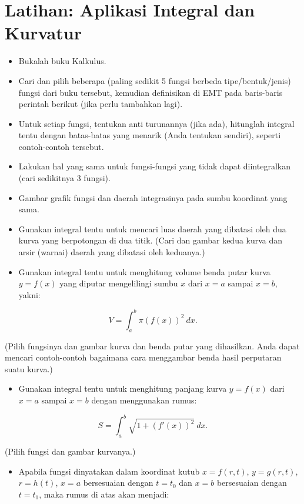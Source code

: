 \documentclass[a4paper,11pt,oneside,enabledeprecatedfontcommands]{scrbook}
\newenvironment{eulernotebook}{}{}
\newcommand{\eulersubheading}[1]{\section{#1}}
\newenvironment{eulercomment}{\par\medskip\noindent}{\par\medskip}
\newenvironment{eulerformula}{}{}
\begin{document}
\begin{eulernotebook}
\eulersubheading{Latihan: Aplikasi Integral dan Kurvatur}
\begin{eulercomment}
\begin{itemize}
    \item Bukalah buku Kalkulus.
    \item Cari dan pilih beberapa (paling sedikit 5 fungsi berbeda tipe/bentuk/jenis) fungsi dari buku tersebut, kemudian definisikan di EMT pada baris-baris perintah berikut (jika perlu tambahkan lagi).
    \item Untuk setiap fungsi, tentukan anti turunannya (jika ada), hitunglah integral tentu dengan batas-batas yang menarik (Anda tentukan sendiri), seperti contoh-contoh tersebut.
    \item Lakukan hal yang sama untuk fungsi-fungsi yang tidak dapat diintegralkan (cari sedikitnya 3 fungsi).
    \item Gambar grafik fungsi dan daerah integrasinya pada sumbu koordinat yang sama.
    \item Gunakan integral tentu untuk mencari luas daerah yang dibatasi oleh dua kurva yang berpotongan di dua titik. (Cari dan gambar kedua kurva dan arsir (warnai) daerah yang dibatasi oleh keduanya.)
    \item Gunakan integral tentu untuk menghitung volume benda putar kurva $y = f(x)$ yang diputar mengelilingi sumbu $x$ dari $x=a$ sampai $x=b$, yakni:
\end{itemize}
\end{eulercomment}
\begin{eulerformula}
\[
V = \int_a^b \pi (f(x))^2\ dx.
\]
\end{eulerformula}
\begin{eulercomment}
(Pilih fungsinya dan gambar kurva dan benda putar yang dihasilkan. Anda dapat mencari contoh-contoh bagaimana cara menggambar benda hasil perputaran suatu kurva.)
\begin{itemize}
    \item Gunakan integral tentu untuk menghitung panjang kurva $y=f(x)$ dari $x=a$ sampai $x=b$ dengan menggunakan rumus:
\end{itemize}
\end{eulercomment}
\begin{eulerformula}
\[
S = \int_a^b \sqrt{1+(f'(x))^2} \ dx.
\]
\end{eulerformula}
\begin{eulercomment}
(Pilih fungsi dan gambar kurvanya.)
\begin{itemize}
    \item Apabila fungsi dinyatakan dalam koordinat kutub $x=f(r,t)$, $y=g(r,t)$, $r=h(t)$, $x=a$ bersesuaian dengan $t=t_0$ dan $x=b$ bersesuaian dengan $t=t_1$, maka rumus di atas akan menjadi:

\end{itemize}
\end{eulercomment}
\end{eulernotebook}
\end{document}
